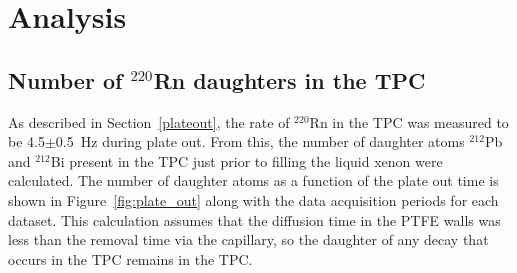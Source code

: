 \section{Analysis}
\label{S:3}
\subsection{Number of $^{220}$Rn daughters in the TPC}
As described in Section~\ref{plateout}, the rate of $^{220}$Rn in the \ac{TPC} was measured to be 4.5$\pm$0.5~Hz during  plate out. From this, the number of daughter atoms $^{212}$Pb and $^{212}$Bi present in the \ac{TPC} just prior to filling the liquid xenon were calculated. The number of daughter atoms as a function of the plate out time is shown in Figure~\ref{fig:plate_out} along with the data acquisition periods for each dataset. This calculation assumes that the diffusion time in the \ac{PTFE} walls was less than the removal time via the capillary, so the daughter of any decay that occurs in the \ac{TPC} remains in the \ac{TPC}.





